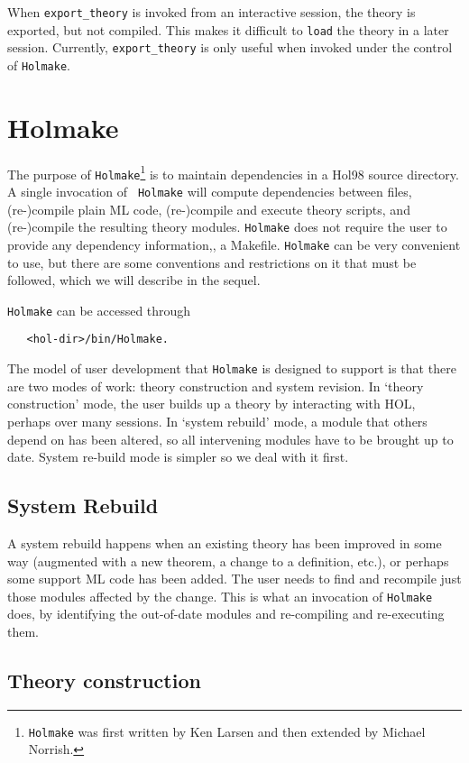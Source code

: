 \documentclass[12pt,fleqn,a4paper]{report}
\begin{document}
When \verb+export_theory+ is invoked from an interactive session, the
theory is exported, but not compiled. This makes it difficult to
\verb+load+ the theory in a later session. Currently,
\verb+export_theory+ is only useful when invoked under the control of
\verb+Holmake+.

\section{Holmake}

The purpose of \verb+Holmake+\footnote{{\tt Holmake} was first written
  by Ken Larsen and then extended by Michael Norrish.} is to maintain
dependencies in a Hol98 source directory. A single invocation of {\tt
  Holmake} will compute dependencies between files, (re-)compile plain
ML code, (re-)compile and execute theory scripts, and (re-)compile the
resulting theory modules. {\tt Holmake} does not require the user to
provide any dependency information,\eg, a Makefile. {\tt Holmake} can
be very convenient to use, but there are some conventions and
restrictions on it that must be followed, which we will describe in
the sequel.

{\tt Holmake} can be accessed through
\begin{verbatim}
   <hol-dir>/bin/Holmake.
\end{verbatim}

The model of user development that {\tt Holmake} is designed to
support is that there are two modes of work: theory construction and
system revision.  In `theory construction' mode, the user builds up a
theory by interacting with HOL, perhaps over many sessions. In `system
rebuild' mode, a module that others depend on has been altered, so all
intervening modules have to be brought up to date. System re-build
mode is simpler so we deal with it first.

\subsection{System Rebuild}

A system rebuild happens when an existing theory has been improved in
some way (augmented with a new theorem, a change to a definition, etc.),
or perhaps some support ML code has been added. The user needs to find
and recompile just those modules affected by the change. This is what an
invocation of {\tt Holmake} does, by identifying the out-of-date modules and
re-compiling and re-executing them.


\subsection{Theory construction}
\end{document}
